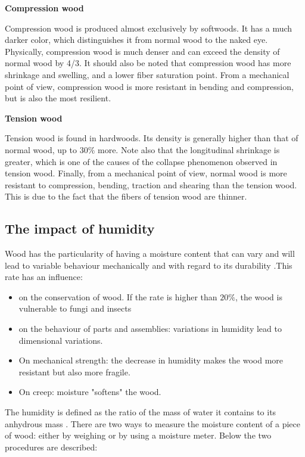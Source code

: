 \smallskip

\textbf{Compression wood}

Compression wood is produced almost exclusively by softwoods. It has a much darker color, which distinguishes it from normal wood to the naked eye. Physically, compression wood is much denser and can exceed the density of normal wood by 4/3. It should also be noted that compression wood has more shrinkage and swelling, and a lower fiber saturation point. From a mechanical point of view, compression wood is more resistant in bending and compression, but is also the most resilient.

\smallskip

\textbf{Tension wood}

Tension wood is found in hardwoods. Its density is generally higher than that of normal wood, up to $30 \%$ more. Note also that the longitudinal shrinkage is greater, which is one of the causes of the collapse phenomenon observed in tension wood. Finally, from a mechanical point of view, normal wood is more resistant to compression, bending, traction and shearing than the tension wood. This is due to the fact that the fibers of tension wood are thinner.

\subsection{The impact of humidity}

Wood has the particularity of having a moisture content that can vary and will lead to variable behaviour mechanically and with regard to its durability \cite{Taazount2021}.This rate has an influence: 

\begin{itemize}
	\item on the conservation of wood. If the rate is higher than $20 \%$, the wood is vulnerable to fungi and insects
	\item on the behaviour of parts and assemblies: variations in humidity lead to dimensional variations.
	\item On mechanical strength: the decrease in humidity makes the wood more resistant but also more fragile.
	\item On creep: moisture "softens" the wood.
\end{itemize}

The humidity is defined as the ratio of the mass of water it contains to its anhydrous mass \cite{Nguyen2016phd}. There are two ways to measure the moisture content of a piece of wood: either by weighing or by using a moisture meter. Below the two procedures are described:

